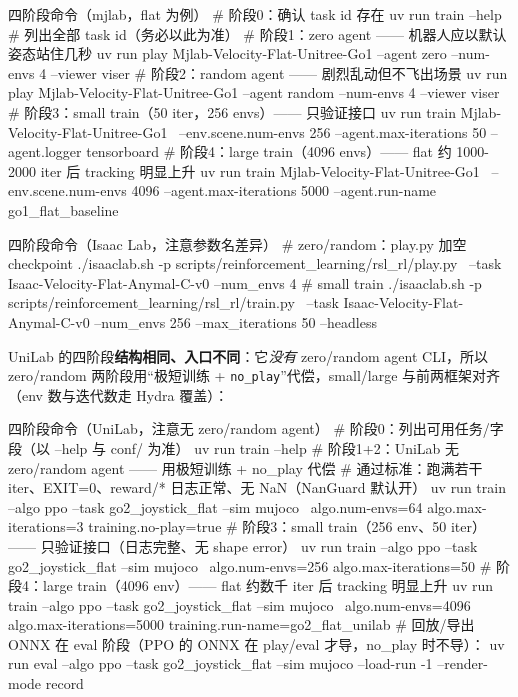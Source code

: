 \begin{codebox}[bash]{四阶段命令（mjlab，flat 为例）}
# 阶段0：确认 task id 存在
uv run train --help          # 列出全部 task id（务必以此为准）
# 阶段1：zero agent —— 机器人应以默认姿态站住几秒
uv run play Mjlab-Velocity-Flat-Unitree-Go1 --agent zero --num-envs 4 --viewer viser
# 阶段2：random agent —— 剧烈乱动但不飞出场景
uv run play Mjlab-Velocity-Flat-Unitree-Go1 --agent random --num-envs 4 --viewer viser
# 阶段3：small train（50 iter，256 envs）—— 只验证接口
uv run train Mjlab-Velocity-Flat-Unitree-Go1 \
  --env.scene.num-envs 256 --agent.max-iterations 50 --agent.logger tensorboard
# 阶段4：large train（4096 envs）—— flat 约 1000-2000 iter 后 tracking 明显上升
uv run train Mjlab-Velocity-Flat-Unitree-Go1 \
  --env.scene.num-envs 4096 --agent.max-iterations 5000 --agent.run-name go1_flat_baseline
\end{codebox}

\begin{codebox}[bash]{四阶段命令（Isaac Lab，注意参数名差异）}
# zero/random：play.py 加空 checkpoint
./isaaclab.sh -p scripts/reinforcement_learning/rsl_rl/play.py \
  --task Isaac-Velocity-Flat-Anymal-C-v0 --num_envs 4
# small train
./isaaclab.sh -p scripts/reinforcement_learning/rsl_rl/train.py \
  --task Isaac-Velocity-Flat-Anymal-C-v0 --num_envs 256 --max_iterations 50 --headless
\end{codebox}

UniLab 的四阶段\textbf{结构相同、入口不同}：它\emph{没有} zero/random agent CLI，所以 zero/random 两阶段用“极短训练 + \verb|no_play|”代偿，small/large 与前两框架对齐（env 数与迭代数走 Hydra 覆盖）：

\begin{codebox}[bash]{四阶段命令（UniLab，注意无 zero/random agent）}
# 阶段0：列出可用任务/字段（以 --help 与 conf/ 为准）
uv run train --help
# 阶段1+2：UniLab 无 zero/random agent —— 用极短训练 + no_play 代偿
#   通过标准：跑满若干 iter、EXIT=0、reward/* 日志正常、无 NaN（NanGuard 默认开）
uv run train --algo ppo --task go2_joystick_flat --sim mujoco \
  algo.num-envs=64 algo.max-iterations=3 training.no-play=true
# 阶段3：small train（256 env、50 iter）—— 只验证接口（日志完整、无 shape error）
uv run train --algo ppo --task go2_joystick_flat --sim mujoco \
  algo.num-envs=256 algo.max-iterations=50
# 阶段4：large train（4096 env）—— flat 约数千 iter 后 tracking 明显上升
uv run train --algo ppo --task go2_joystick_flat --sim mujoco \
  algo.num-envs=4096 algo.max-iterations=5000 training.run-name=go2_flat_unilab
# 回放/导出 ONNX 在 eval 阶段（PPO 的 ONNX 在 play/eval 才导，no_play 时不导）：
uv run eval --algo ppo --task go2_joystick_flat --sim mujoco --load-run -1 --render-mode record
\end{codebox}

